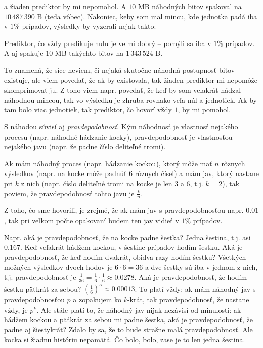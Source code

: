 a žiaden prediktor by mi nepomohol. A $10$ MB náhodných bitov  spakoval na
$10\,487\,390$  B (teda vôbec). Nakoniec, keby som mal mincu, kde jednotka padá iba v $1\%$
prípadov, výsledky by vyzerali nejak takto:


\centerline{}


Prediktor, čo vždy predikuje nulu je veľmi dobrý -- pomýli sa iba v $1\%$ prípadov. 
A aj  spakuje $10$ MB takýchto bitov na $1\,343\,524$ B.


To znamená, že síce neviem, či nejaká skutočne náhodná postupnosť bitov 
existuje, ale viem povedať, že ak by existovala, tak žiaden prediktor mi
nepomôže skomprimovať
ju.
Z toho viem napr. povedať, že keď by som veľakrát hádzal náhodnou mincou, 
tak vo výsledku je zhruba rovnako
veľa núl a jednotiek. Ak by tam bolo viac jednotiek, tak prediktor, čo hovorí vždy $1$,
by mi pomohol.


S náhodou súvisí aj {\em pravdepodobnosť}. Kým náhodnosť je vlastnosť nejakého procesu
(napr. náhodné hádzanie kocky), pravdepodobnosť je vlastnosťou nejakého javu (napr. že 
padne číslo deliteľné tromi). 


Ak mám náhodný proces (napr. hádzanie kockou), 
ktorý môže mať $n$ rôznych výsledkov (napr. na kocke môže 
padnúť $6$ rôznych čísel) a mám jav, ktorý nastane pri $k$ z nich (napr. číslo deliteľné 
tromi na kocke je len $3$ a $6$, t.j. $k=2$), tak poviem, že pravdepodobnosť tohto javu je
$\frac{k}{n}$.

 
Z toho, čo sme hovorili, je zrejmé, že ak mám jav s pravdepodobnosťou napr. $0.01$,
tak pri veľkom počte opakovaní budem ten jav vidieť v $1\%$ prípadov.


Napr. aká je pravdepodobnosť, že na kocke padne šestka? Jedna šestina, t.j. asi $0.167$. 
Keď veľakrát hádžem kockou,
v šestine prípadov hodím šestku. Aká je pravdepodobnosť, že keď hodím 
dvakrát, obidva razy hodím šestku?
Všetkých možných výsledkov dvoch hodov je $6\cdot 6=36$ a dve šestky sú iba v jednom 
z nich, t.j. pravdepodobnosť je $\frac{1}{36}=\frac{1}{6}\cdot\frac{1}{6}\approx0.0278$. 
Aká je pravdepodobnosť, že hodím šestku päťkrát za sebou? 
$\left(\frac{1}{6}\right)^5\approx0.00013$.
To platí vždy: ak mám náhodný jav s pravdepodobnosťou
$p$ a zopakujem ko $k$-krát, tak pravdepodobnosť, že nastane vždy, je $p^k$.
Ale stále platí to, že náhodný jav nijak nezávisí od minulosti: ak hádžem kockou 
a päťkrát za sebou mi padne šestka, aká je pravdepodobnosť, že padne aj šiestykrát?
Zdalo by sa, že to bude strašne malá pravdepodobnosť. Ale kocka si žiadnu históriu nepamätá.
Čo bolo, bolo, zase je to len jedna šestina.



